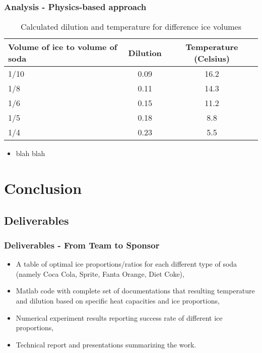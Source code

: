 \documentclass[compress,handout,10pt]{beamer}
\let\olditem\item
\renewcommand{\item}{\setlength{\itemsep}{0.5\baselineskip}\olditem}
\begin{document}
\begin{frame}
    \frametitle{Analysis - Physics-based approach}
\begin{table}[ h]
\centering
\begin{tabular}{ l || c|c}
 Volume of ice to volume of soda &Dilution &Temperature (Celsius) \\
\hline  
1/10 & 0.09&16.2\\ 
\hline  
1/8 & 0.11&14.3\\ 
\hline 
1/6 & 0.15&11.2\\ 
\hline 
1/5 & 0.18&8.8\\ 
\hline 
1/4 & 0.23&5.5\\ 
\hline    
\end{tabular}
\caption{Calculated dilution and temperature for difference ice volumes}
\end{table}

\begin{itemize}
\item blah blah
\end{itemize}

\end{frame}


\section{Conclusion}
\subsection{Deliverables}
\begin{frame}
    \frametitle{Deliverables - From Team to Sponsor}
\begin{itemize}
    \item A table of optimal ice proportions/ratios for each different type of soda (namely Coca Cola, Sprite, Fanta Orange, Diet Coke),
    \item Matlab code with complete set of documentations that resulting temperature and dilution based on specific heat capacities and ice proportions,
    \item Numerical experiment results reporting success rate of different ice proportions,
    \item Technical report and presentations summarizing the work. 
\end{itemize}

\end{frame}
\end{document}
